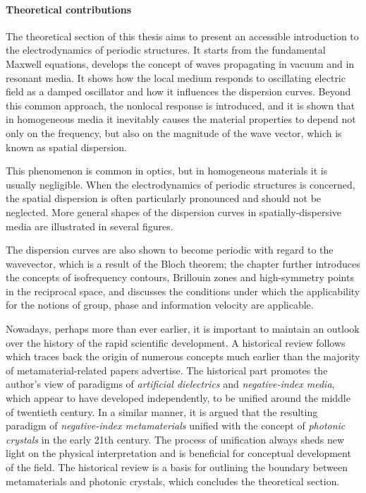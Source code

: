 \paragraph{Theoretical contributions}
The theoretical section of this thesis aims to present an accessible introduction to the electrodynamics of periodic structures. It starts from the fundamental Maxwell equations, develops the concept of waves propagating in vacuum and in resonant media. It shows how the local medium responds to oscillating electric field as a damped oscillator and how it influences the dispersion curves. Beyond this common approach, the nonlocal response is introduced, and it is shown that in homogeneous media it inevitably causes the material properties to depend not only on the frequency, but also on the magnitude of the wave vector, which is known as spatial dispersion. 

This phenomenon is common in optics, but in homogeneous materials it is usually negligible. When the electrodynamics of periodic structures is concerned, the spatial dispersion is often particularly pronounced and should not be neglected. More general shapes of the dispersion curves in spatially-dispersive media are illustrated in several figures. 

The dispersion curves are also shown to become periodic with regard to the wavevector, which is a result of the Bloch theorem; the chapter further introduces the concepts of isofrequency contours, Brillouin zones and high-symmetry points in the reciprocal space, and discusses the conditions under which the applicability for the notions of group, phase and information velocity are applicable.

Nowadays, perhaps more than ever earlier, it is important to maintain an outlook over the history of the rapid scientific development. A  historical review follows which traces back the origin of numerous concepts much earlier than the majority of metamaterial-related papers advertise. %
The historical part promotes the author's view of paradigms of \textit{artificial dielectrics} and \textit{negative-index media}, which appear to have developed independently, to be unified around the middle of twentieth century. In a similar manner, it is argued that the resulting paradigm of \textit{negative-index metamaterials} unified with the concept of \textit{photonic crystals} in the early 21th century. The process of unification always sheds new light on the physical interpretation and is beneficial for conceptual development of the field. The historical review is a basis for outlining the boundary between metamaterials and photonic crystals, which concludes the theoretical section.

